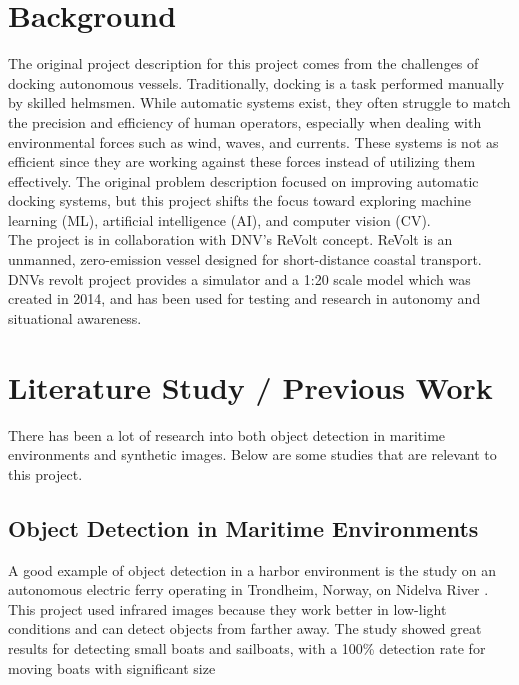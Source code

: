 




\section{Background}

The original project description for this project comes from the challenges of docking autonomous vessels. Traditionally, docking is a task performed manually by skilled helmsmen. While automatic systems exist, they often struggle to match the precision and efficiency of human operators, especially when dealing with environmental forces such as wind, waves, and currents. These systems is not as efficient since they are working against these forces instead of utilizing them effectively. The original problem description focused on improving automatic docking systems, but this project shifts the focus toward exploring machine learning (ML), artificial intelligence (AI), and computer vision (CV).\\


\noindent The project is in collaboration with DNV's ReVolt concept. ReVolt is an unmanned, zero-emission vessel designed for short-distance coastal transport. DNVs revolt project provides a simulator and a 1:20 scale model which was created in 2014, and has been used for testing and research in autonomy and situational awareness.

\section{Literature Study / Previous Work}

There has been a lot of research into both object detection in maritime environments and synthetic images. Below are some studies that are relevant to this project.

\subsection{Object Detection in Maritime Environments}

A good example of object detection in a harbor environment is the study on an autonomous electric ferry operating in Trondheim, Norway, on Nidelva River \cite{NTNUFerry}. This project used infrared images because they work better in low-light conditions and can detect objects from farther away. The study showed great results for detecting small boats and sailboats, with a 100\% detection rate for moving boats with significant size \\

